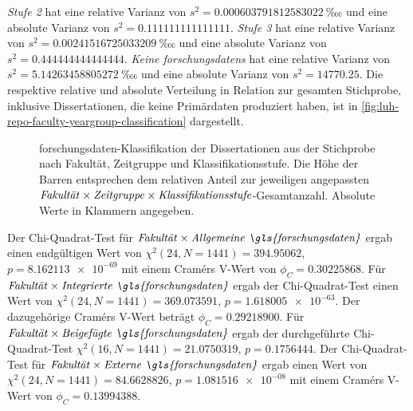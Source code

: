 \textit{Stufe 2} hat eine relative Varianz von $s^2=\SI[round-mode=places,round-precision=3]{0.000603791812583022}{‱}$ und eine absolute Varianz von $s^2=\num[round-mode=places,round-precision=3]{0.111111111111111}$.
\textit{Stufe 3} hat eine relative Varianz von $s^2=\SI[round-mode=places,round-precision=3]{0.00241516725033209}{‱}$ und eine absolute Varianz von $s^2=\num[round-mode=places,round-precision=3]{0.444444444444444}$.
\textit{Keine \glspl{forschungsdaten}} hat eine relative Varianz von $s^2=\SI[round-mode=places,round-precision=3]{5.14263458805272}{‱}$ und eine absolute Varianz von $s^2=\num[round-mode=places,round-precision=3]{14770.25}$.
%
Die respektive relative und absolute Verteilung in Relation zur gesamten Stichprobe, inklusive Dissertationen, die keine Primärdaten produziert haben, ist in \cref{fig:luh-repo-faculty-yeargroup-classification} dargestellt.
\begin{figure}[!htbp]
    \resizebox{\ifdim\width>\textwidth\textwidth\else\width\fi}{!}{}
    \caption{\gls{forschungsdaten}-Klassifikation der Dissertationen aus der Stichprobe nach Fakultät, Zeitgruppe und Klassifikationsstufe.
    Die Höhe der Barren entsprechen dem relativen Anteil zur jeweiligen angepassten $\text{\textit{Fakultät}}\times\text{\textit{Zeitgruppe}}\times\text{\textit{Klassifikationsstufe}}$-Gesamtanzahl.
    Absolute Werte in Klammern angegeben.}
    \label{fig:luh-repo-faculty-yeargroup-classification-adjusted}
\end{figure}

Der Chi-Quadrat-Test für $\text{\textit{Fakultät}}\times\text{\textit{Allgemeine \gls{forschungsdaten}}}$ ergab einen endgültigen Wert von $\chi^2 (\num{24}, N = \num{1441}) = \num[round-mode=places,round-precision=3]{394.95062}$, $p = \num[round-mode=places,round-precision=3]{8.162113e-69}$ mit einem Cramérs V-Wert von $\phi_C=\num[round-mode=places,round-precision=3]{0.30225868}$.
Für $\text{\textit{Fakultät}}\times\text{\textit{Integrierte \gls{forschungsdaten}}}$ ergab der Chi-Quadrat-Test einen Wert von $\chi^2 (\num{24}, N = \num{1441}) = \num[round-mode=places,round-precision=3]{369.073591}$, $p = \num[round-mode=places,round-precision=3]{1.618005e-63}$.
Der dazugehörige Cramérs V-Wert beträgt $\phi_C=\num[round-mode=places,round-precision=3]{0.29218900}$.
Für $\text{\textit{Fakultät}}\times\text{\textit{Beigefügte \gls{forschungsdaten}}}$ ergab der durchgeführte Chi-Quadrat-Test $\chi^2 (\num{16}, N = \num{1441}) = \num[round-mode=places,round-precision=3]{21.0750319}$, $p = \num[round-mode=places,round-precision=3]{0.1756444}$.
Der Chi-Quadrat-Test für $\text{\textit{Fakultät}}\times\text{\textit{Externe \gls{forschungsdaten}}}$ ergab einen Wert von $\chi^2 (\num{24}, N = \num{1441}) = \num[round-mode=places,round-precision=3]{84.6628826}$, $p = \num[round-mode=places,round-precision=3]{1.081516e-08}$ mit einem Cramérs V-Wert von $\phi_C=\num[round-mode=places,round-precision=3]{0.13994388}$.

